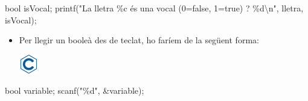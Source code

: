 \documentclass[]{book}
\newenvironment{Shaded}{\begin{snugshade}}{\end{snugshade}}
\newcommand{\DataTypeTok}[1]{\textcolor[rgb]{0.13,0.29,0.53}{#1}}
\newcommand{\NormalTok}[1]{#1}
\newcommand{\SpecialCharTok}[1]{\textcolor[rgb]{0.00,0.00,0.00}{#1}}
\newcommand{\StringTok}[1]{\textcolor[rgb]{0.31,0.60,0.02}{#1}}
\providecommand{\tightlist}{%
  \setlength{\itemsep}{0pt}\setlength{\parskip}{0pt}}
\begin{document}
\begin{Shaded}
\begin{Highlighting}[]
\DataTypeTok{bool}\NormalTok{ isVocal;}
\NormalTok{printf(}\StringTok{"La lletra \%c és una vocal (0=false, 1=true) ? \%d}\SpecialCharTok{\textbackslash{}n}\StringTok{"}\NormalTok{, lletra, isVocal);}
\end{Highlighting}
\end{Shaded}

\begin{itemize}
\tightlist
\item
  Per llegir un booleà des de teclat, ho faríem de la següent forma:

  \includegraphics{./img/c.png}
\end{itemize}

\begin{Shaded}
\begin{Highlighting}[]
\DataTypeTok{bool}\NormalTok{ variable;}
\NormalTok{scanf(}\StringTok{"\%d"}\NormalTok{, \&variable);}
\end{Highlighting}
\end{Shaded}
\end{document}
